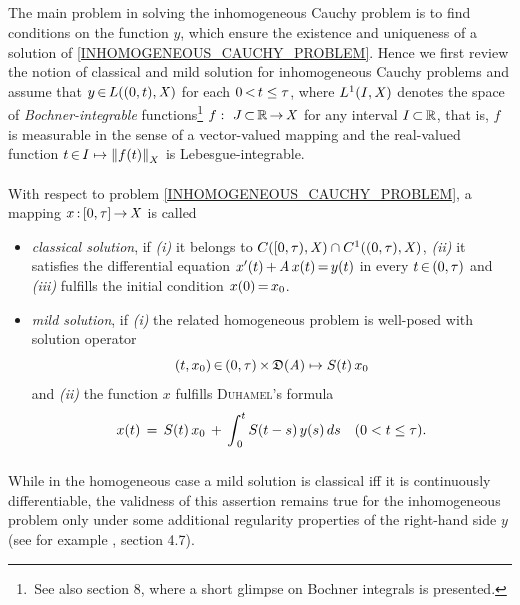 \documentclass[11pt,twoside]{article}
\begin{document}
\subparagraph{} %
The main problem in solving the inhomogeneous Cauchy problem is to find
conditions on the function $y$,
which ensure the existence and uniqueness of a solution
of \eqref{INHOMOGENEOUS_CAUCHY_PROBLEM}. 
Hence we first review the notion of classical and mild solution
for inhomogeneous Cauchy problems
and assume that $y {\,\in\,} L((0,t),\mathit{X})$ for each $0 {\,<\,} t \leq \tau$,
where $L^1(I,\mathit{X})$ denotes the space
of \textit{Bochner-integrable} functions\footnote{
\,See also section 8,
where a short glimpse on Bochner integrals is presented.}
$f :\ J {\,\subset\,} {\mathbb{R}} {\,\to\,} \mathit{X}$
for any interval $I {\,\subset\,} {\mathbb{R}}$,
that is,
$f$ is measurable in the sense of a vector-valued mapping
and the real-valued function $t {\,\in\,} I \mapsto \left\lVert f(t) \right\rVert_X$
is Lebesgue-integrable.

\paragraph{} %
With respect to problem \eqref{INHOMOGENEOUS_CAUCHY_PROBLEM},
a mapping $x {\,:\,} [0,\tau] {\,\to\,} \mathit{X}$ is called

\begin{itemize}[leftmargin=4mm]
\item[1.]
\textit{classical solution},
if
\textit{(i)}   it belongs to $C([0,\tau),\mathit{X}) \cap C^1((0,\tau),\mathit{X})$,
\textit{(ii)}  it satisfies the differential equation
               $x'(t) \,{+}\, \mathit{A} \, x(t) {\,=\,} y(t)$
               in every $t {\,\in\,} (0,\tau)$ and
\textit{(iii)} fulfills the initial condition $x(0) {\,=\,} x_0$.

\item[2.]
\textit{mild solution},
if
\textit{(i)}  the related homogeneous problem is well-posed
              with solution operator
              \[
                (t,x_0) {\,\in\,} (0,\tau) {\,\times\,} \mathfrak{D}(\mathit{A}) \mapsto S(t) \, x_0
              \]
              and
\textit{(ii)} the function $x$ fulfills \textsc{Duhamel}'s formula
\begin{equation}\label{DUHAMEL_FORMULA}
x(t) \,=\, {S}(t) \, x_0 \,+\, \int_{\,0}^t {S}(t-s) \, y(s) \, ds
\quad (0 < t \leq \tau).
\end{equation}
\end{itemize}

\subparagraph{} %
While in the homogeneous case a mild solution is classical
iff it is continuously differentiable,
the validness of this assertion remains true for the inhomogeneous problem
only
under some additional regularity properties of the right-hand side $y$
(see for example \cite{Mi}, section 4.7).
\end{document}
